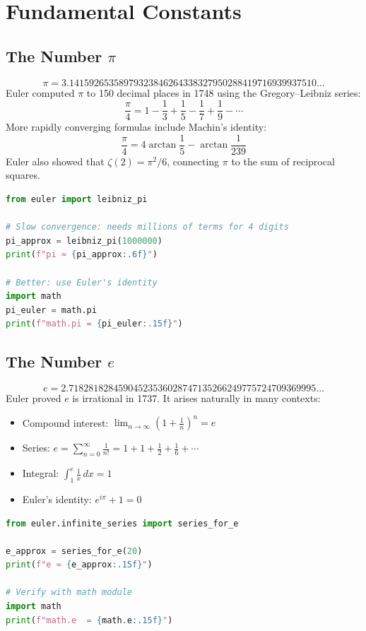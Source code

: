 
\section{Fundamental Constants}

\subsection{The Number $\pi$}
\[
\pi = 3.14159265358979323846264338327950288419716939937510\dots
\]
Euler computed $\pi$ to 150 decimal places in 1748 using the Gregory--Leibniz series:
\[
\frac{\pi}{4} = 1 - \frac{1}{3} + \frac{1}{5} - \frac{1}{7} + \frac{1}{9} - \cdots
\]
More rapidly converging formulas include Machin's identity:
\[
\frac{\pi}{4} = 4\arctan\frac{1}{5} - \arctan\frac{1}{239}
\]
Euler also showed that $\zeta(2) = \pi^2/6$, connecting $\pi$ to the sum of reciprocal squares.

\begin{lstlisting}[language=Python, caption=Computing $\pi$ using the Leibniz series]
from euler import leibniz_pi

# Slow convergence: needs millions of terms for 4 digits
pi_approx = leibniz_pi(1000000)
print(f"pi ≈ {pi_approx:.6f}")

# Better: use Euler's identity
import math
pi_euler = math.pi
print(f"math.pi = {pi_euler:.15f}")
\end{lstlisting}

\subsection{The Number $e$}
\[
e = 2.71828182845904523536028747135266249775724709369995\dots
\]
Euler proved $e$ is irrational in 1737. It arises naturally in many contexts:
\begin{itemize}
    \item Compound interest: $\displaystyle \lim_{n\to\infty}\left(1+\frac{1}{n}\right)^n = e$
    \item Series: $\displaystyle e = \sum_{n=0}^{\infty}\frac{1}{n!} = 1 + 1 + \frac{1}{2} + \frac{1}{6} + \cdots$
    \item Integral: $\displaystyle \int_1^e \frac{1}{x}\,dx = 1$
    \item Euler's identity: $e^{i\pi} + 1 = 0$
\end{itemize}

\begin{lstlisting}[language=Python, caption=Computing $e$ from its series]
from euler.infinite_series import series_for_e

e_approx = series_for_e(20)
print(f"e ≈ {e_approx:.15f}")

# Verify with math module
import math
print(f"math.e  = {math.e:.15f}")
\end{lstlisting}

